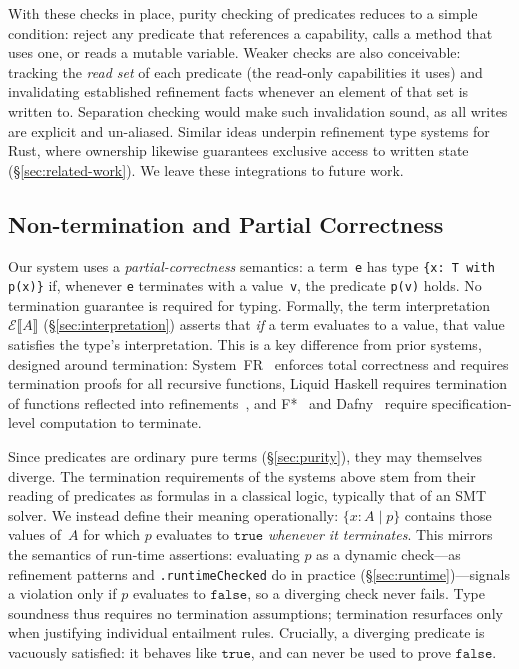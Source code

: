 \documentclass[acmsmall]{acmart}
\begin{document}
With these checks in place, purity checking of predicates reduces to a simple condition: reject any predicate that references a capability, calls a method that uses one, or reads a mutable variable. Weaker checks are also conceivable: tracking the \emph{read set} of each predicate (the read-only capabilities it uses) and invalidating established refinement facts whenever an element of that set is written to. Separation checking would make such invalidation sound, as all writes are explicit and un-aliased. Similar ideas underpin refinement type systems for Rust, where ownership likewise guarantees exclusive access to written state (\S\ref{sec:related-work}). We leave these integrations to future work.

\subsection{Non-termination and Partial Correctness}\label{sec:termination}

Our system uses a \emph{partial-correctness} semantics: a term~\lstinline!e! has type \lstinline!{x: T with p(x)}! if, whenever \lstinline!e! terminates with a value~\lstinline!v!, the predicate \lstinline!p(v)! holds. No termination guarantee is required for typing. Formally, the term interpretation $\mathcal{E}\llbracket A \rrbracket$ (\S\ref{sec:interpretation}) asserts that \emph{if} a term evaluates to a value, that value satisfies the type's interpretation. This is a key difference from prior systems, designed around termination: System~FR~\cite{hamza2019} enforces total correctness and requires termination proofs for all recursive functions, Liquid Haskell requires termination of functions reflected into refinements~\cite{vazou2014}, and F*~\cite{swamy2016} and Dafny~\cite{leino2010} require specification-level computation to terminate.

Since predicates are ordinary pure terms (\S\ref{sec:purity}), they may themselves diverge. The termination requirements of the systems above stem from their reading of predicates as formulas in a classical logic, typically that of an SMT solver. We instead define their meaning operationally: $\{x : A \mid p\}$ contains those values of~$A$ for which $p$ evaluates to $\texttt{true}$ \emph{whenever it terminates}. This mirrors the semantics of run-time assertions: evaluating $p$ as a dynamic check---as refinement patterns and \lstinline!.runtimeChecked! do in practice (\S\ref{sec:runtime})---signals a violation only if $p$ evaluates to $\texttt{false}$, so a diverging check never fails. Type soundness thus requires no termination assumptions; termination resurfaces only when justifying individual entailment rules. Crucially, a diverging predicate is vacuously satisfied: it behaves like $\texttt{true}$, and can never be used to prove $\texttt{false}$.
\end{document}
